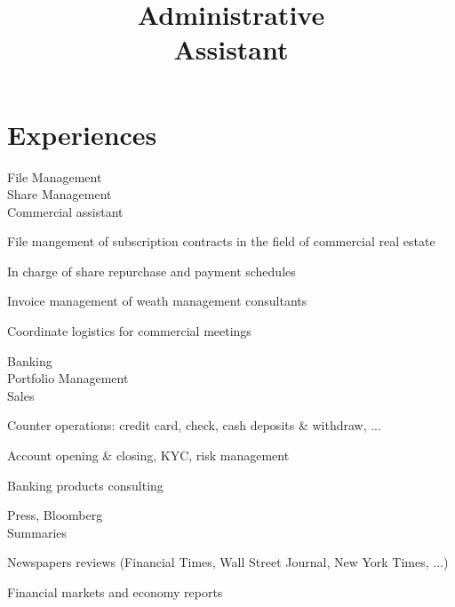 \documentclass[a4paper,11pt]{cv4tw}%
\title{Administrative\\Assistant}
\begin{document}



	\section{Experiences}

	{File Management\\Share Management\\Commercial assistant}
		{ 
		\begin{missions}
			\item File mangement of subscription contracts in the field of commercial real estate
			\item In charge of share repurchase and payment schedules
			\item Invoice management of weath management consultants
			\item Coordinate logistics for commercial meetings
		\end{missions}
	}

	{Banking\\Portfolio Management\\Sales}
		{ 
		\begin{missions}
			\item Counter operations: credit card, check, cash deposits \& withdraw, ...
			\item Account opening \& closing, KYC, risk management
			\item Banking products consulting
		\end{missions}
	}

	{Press, Bloomberg\\Summaries}
		{
		\begin{missions}
			\item Newspapers reviews (Financial Times, Wall Street Journal, New York Times, ...)
			\item Financial markets and economy reports
		\end{missions}
	}
\end{document}
